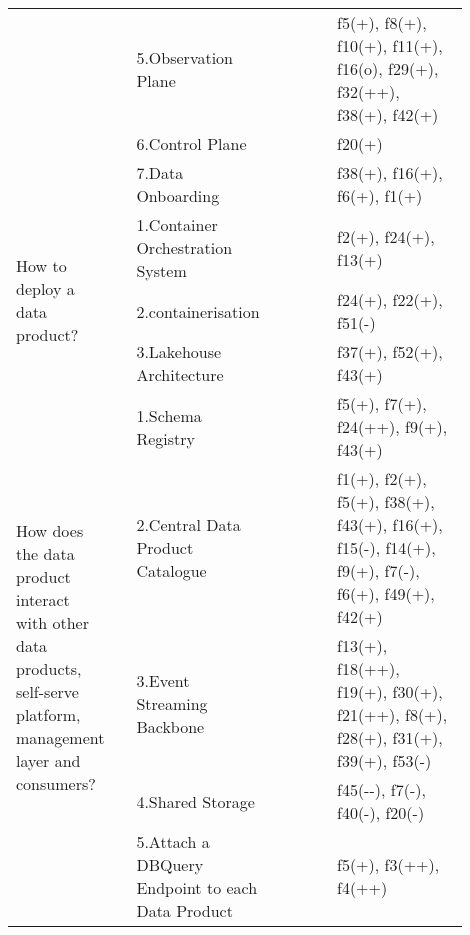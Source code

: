 \begin{tabular}{|p{0.12\linewidth}|p{0.015\linewidth}|p{0.3\linewidth}|p{0.15\linewidth}|p{0.31\linewidth}|}
 & \cellcolor{emerald_shape_6}{} & 5.Observation Plane&\cellcolor{emerald_shape_3}{s3, s7, s11, s13, s22, s52, i3} & f5(+), f8(+), f10(+), f11(+), f16(o), f29(+), f32(++), f38(+), f42(+)\\
 & \cellcolor{emerald_shape_6}{} & 6.Control Plane&\cellcolor{emerald_shape_2}{s49, s52, i1, i3} & f20(+)\\
 & \multirow{-7}{\linewidth}{ \cellcolor{emerald_shape_6}{43}} &7.Data Onboarding&\cellcolor{emerald_shape_3}{s4, s5, s15, s30, s52, i1, i3} & f38(+), f16(+), f6(+), f1(+)\\
\multirow{3}{\linewidth}{How to deploy a data product?} &\cellcolor{emerald_shape_4}{} &1.Container Orchestration System&\cellcolor{emerald_shape_6}{s6, s14, s32, s35, s39, s43, s45, s47, i3, i4, i5} & f2(+), f24(+), f13(+)\\
 & \cellcolor{emerald_shape_4}{} & 2.containerisation&\cellcolor{emerald_shape_6}{s14, s15, s30, s32, s33, s45, s47, i3, i4, i6} & f24(+), f22(+), f51(-)\\
 & \multirow{-3}{\linewidth}{ \cellcolor{emerald_shape_4}{17}} &3.Lakehouse Architecture&\cellcolor{emerald_shape_3}{i5, i6} & f37(+), f52(+), f43(+)\\
\multirow{6}{\linewidth}{How does the data product interact with other data products, self-serve platform, management layer and consumers?} &\cellcolor{emerald_shape_7}{} &1.Schema Registry&\cellcolor{emerald_shape_4}{s3, s6, s7, s15, s16, s17, s19, s20, s24, s41, s47, s48, s54, s57, i3, i5, i6} & f5(+), f7(+), f24(++), f9(+), f43(+)\\
 & \cellcolor{emerald_shape_7}{} & 2.Central Data Product Catalogue&\cellcolor{emerald_shape_5}{s5, s9, s15, s20, s23, s31, s32, s39, s40, s42, s45, s46, s47, s48, s49, s53, s54, s55, i1, i3} & f1(+), f2(+), f5(+), f38(+), f43(+), f16(+), f15(-), f14(+), f9(+), f7(-), f6(+), f49(+), f42(+)\\
 & \cellcolor{emerald_shape_7}{} & 3.Event Streaming Backbone&\cellcolor{emerald_shape_5}{s4, s9, s17, s20, s26, s33, s34, s36, s38, s41, s44, s45, s48, s51, s52, s53, s55, s56, s57, i1, i2, i3, i5, i6} & f13(+), f18(++), f19(+), f30(+), f21(++), f8(+), f28(+), f31(+), f39(+), f53(-)\\
 & \cellcolor{emerald_shape_7}{} & 4.Shared Storage&\cellcolor{emerald_shape_1}{s33, i3} & f45(-{}-), f7(-), f40(-), f20(-)\\
 & \cellcolor{emerald_shape_7}{} & 5.Attach a DBQuery Endpoint to each Data Product&\cellcolor{emerald_shape_5}{s2, s3, s5, s7, s10, s13, s14, s15, s16, s27, s30, s31, s32, s36, s37, s38, s39, s43, s46, s48, s49, i1} & f5(+), f3(++), f4(++)\\

\end{tabular}
